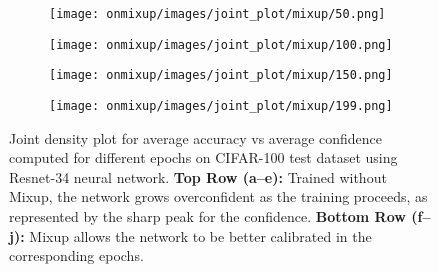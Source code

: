 \documentclass{article}
\begin{document}
\begin{figure}[htb]
\begin{subfigure}[b]{0.19\textwidth}
         \centering
         \noindent\texttt{[image: onmixup/images/joint\_plot/mixup/50.png]}
         \caption{}
     \end{subfigure}
     \hfill
     \begin{subfigure}[b]{0.19\textwidth}
         \centering
         \noindent\texttt{[image: onmixup/images/joint\_plot/mixup/100.png]}
         \caption{}
     \end{subfigure}
          \centering
     \begin{subfigure}[b]{0.19\textwidth}
         \centering
         \noindent\texttt{[image: onmixup/images/joint\_plot/mixup/150.png]}
         \caption{}
     \end{subfigure}
     \hfill
     \begin{subfigure}[b]{0.19\textwidth}
         \centering
         \noindent\texttt{[image: onmixup/images/joint\_plot/mixup/199.png]}
         \caption{}
     \end{subfigure}
        \caption{Joint density plot for average accuracy vs average confidence computed for different epochs on CIFAR-100 test dataset using Resnet-34 neural network. \textbf{Top Row (a--e):} Trained without Mixup, the network grows overconfident as the training proceeds, as represented by the sharp peak for the confidence. \textbf{Bottom Row (f--j):} Mixup allows the network to be better calibrated in the corresponding epochs.}
        \label{fig:hypothesis}
\end{figure}
\end{document}
